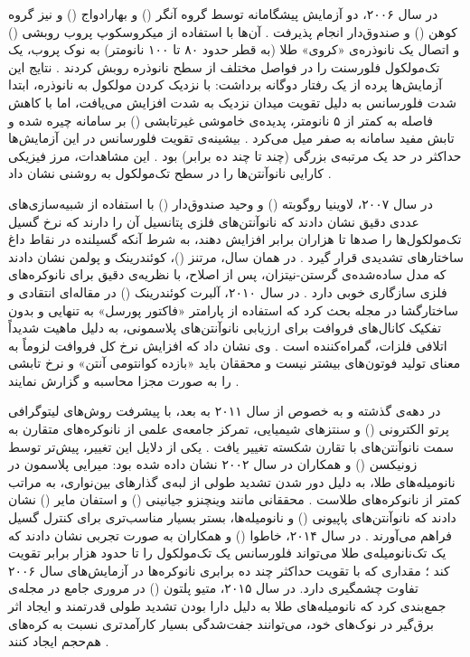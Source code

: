 \documentclass[12pt,a4paper]{report}
\begin{document}
در سال ۲۰۰۶، دو آزمایش پیشگامانه توسط گروه آنگر () و بهارادواج () و نیز گروه کوهن () و صندوق‌دار انجام پذیرفت \cite{anger,kuhn,novotny}. آن‌ها با استفاده از میکروسکوپ پروب روبشی () و اتصال یک نانوذره‌ی «کروی» طلا (به قطر حدود ۸۰ تا ۱۰۰ نانومتر) به نوک پروب، یک تک‌مولکول فلورسنت را در فواصل مختلف از سطح نانوذره روبش کردند \cite{anger,kuhn}. نتایج این آزمایش‌ها پرده از یک رفتار دوگانه برداشت: با نزدیک کردن مولکول به نانوذره، ابتدا شدت فلورسانس به دلیل تقویت میدان نزدیک به شدت افزایش می‌یافت، اما با کاهش فاصله به کمتر از ۵ نانومتر، پدیده‌ی خاموشی غیرتابشی () بر سامانه چیره شده و تابش مفید سامانه به صفر میل می‌کرد \cite{anger,novotny}. بیشینه‌ی تقویت فلورسانس در این آزمایش‌ها حداکثر در حد یک مرتبه‌ی بزرگی (چند تا چند ده برابر) بود \cite{anger,kuhn}. این مشاهدات، مرز فیزیکی کارایی نانوآنتن‌ها را در سطح تک‌مولکول به روشنی نشان داد \cite{novotny,maier}.

در سال ۲۰۰۷، لاوینیا روگوبته () و وحید صندوق‌دار () با استفاده از شبیه‌سازی‌های عددی دقیق نشان دادند که نانوآنتن‌های فلزی پتانسیل آن را دارند که نرخ گسیل تک‌مولکول‌ها را صدها تا هزاران برابر افزایش دهند، به شرط آنکه گسیلنده در نقاط داغ ساختارهای تشدیدی قرار گیرد \cite{rogobete,novotny}. در همان سال، مرتنز ()، کوئندرینک و پولمن نشان دادند که مدل ساده‌شده‌ی گرستن-نیتزان، پس از اصلاح، با نظریه‌ی دقیق برای نانوکره‌های فلزی سازگاری خوبی دارد \cite{mertens}. در سال ۲۰۱۰، آلبرت کوئندرینک () در مقاله‌ای انتقادی و ساختارگشا در مجله  بحث کرد که استفاده از پارامتر «فاکتور پورسل» به تنهایی و بدون تفکیک کانال‌های فروافت برای ارزیابی نانوآنتن‌های پلاسمونی، به دلیل ماهیت شدیداً اتلافی فلزات، گمراه‌کننده است \cite{koenderink}. وی نشان داد که افزایش نرخ کل فروافت لزوماً به معنای تولید فوتون‌های بیشتر نیست و محققان باید «بازده کوانتومی آنتن» و نرخ تابشی را به صورت مجزا محاسبه و گزارش نمایند \cite{koenderink,novotny}.

در دهه‌ی گذشته و به خصوص از سال ۲۰۱۱ به بعد، با پیشرفت روش‌های لیتوگرافی پرتو الکترونی () و سنتزهای شیمیایی، تمرکز جامعه‌ی علمی از نانوکره‌های متقارن به سمت نانوآنتن‌های با تقارن شکسته تغییر یافت \cite{maier,giannini}. یکی از دلایل این تغییر، پیش‌تر توسط زونیکسن () و همکاران در سال ۲۰۰۲ نشان داده شده بود: میرایی پلاسمون در نانومیله‌های طلا، به دلیل دور شدن تشدید طولی از لبه‌ی گذارهای بین‌نواری، به مراتب کمتر از نانوکره‌های طلاست \cite{sonnichsen}. محققانی مانند وینچنزو جیانینی () و استفان مایر () نشان دادند که نانوآنتن‌های پاپیونی () و نانومیله‌ها، بستر بسیار مناسب‌تری برای کنترل گسیل فراهم می‌آورند \cite{giannini,maier}. در سال ۲۰۱۴، خاطوا () و همکاران به صورت تجربی نشان دادند که یک تک‌نانومیله‌ی طلا می‌تواند فلورسانس یک تک‌مولکول را تا حدود هزار برابر تقویت کند \cite{khatua}؛ مقداری که با تقویت حداکثر چند ده برابری نانوکره‌ها در آزمایش‌های سال ۲۰۰۶ تفاوت چشمگیری دارد. در سال ۲۰۱۵، متیو پلتون () در مروری جامع در مجله‌ی  جمع‌بندی کرد که نانومیله‌های طلا به دلیل دارا بودن تشدید طولی قدرتمند و ایجاد اثر برق‌گیر در نوک‌های خود، می‌توانند جفت‌شدگی بسیار کارآمدتری نسبت به کره‌های هم‌حجم ایجاد کنند \cite{pelton,novotny}.
\end{document}
